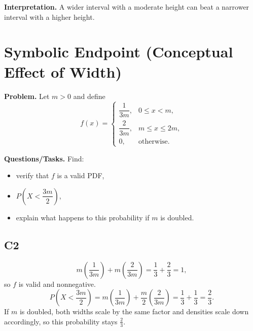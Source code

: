 \textbf{Interpretation.}
A wider interval with a moderate height can beat a narrower interval with a higher height.

\section{Symbolic Endpoint (Conceptual Effect of Width)}

\textbf{Problem.}
Let $m>0$ and define
\[
f(x)=
\begin{cases}
\dfrac{1}{3m}, & 0\le x<m,\\
\dfrac{2}{3m}, & m\le x\le 2m,\\
0, & \text{otherwise.}
\end{cases}
\]

\textbf{Questions/Tasks.}
Find:
\begin{itemize}
    \item[(a)] verify that $f$ is a valid PDF,
    \item[(b)] $P\left(X<\dfrac{3m}{2}\right)$,
    \item[(c)] explain what happens to this probability if $m$ is doubled.
\end{itemize}

\subsection*{C2}
\[
m\left(\frac{1}{3m}\right)+m\left(\frac{2}{3m}\right)=\frac{1}{3}+\frac{2}{3}=1,
\]
so $f$ is valid and nonnegative.
\[
P\left(X<\frac{3m}{2}\right)=m\left(\frac{1}{3m}\right)+\frac{m}{2}\left(\frac{2}{3m}\right)=\frac{1}{3}+\frac{1}{3}=\frac{2}{3}.
\]
If $m$ is doubled, both widths scale by the same factor and densities scale down accordingly, so this probability stays $\frac{2}{3}$.
\begin{center}
\end{center}

